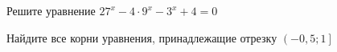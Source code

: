 \begin{ex}
	\begin{condition}
		\begin{enumcols}[label=\asbuk*)]
			\item Решите уравнение \( 27^x - 4\cdot 9^x -3^x + 4 = 0 \)
			\item Найдите все корни уравнения, принадлежащие отрезку \(\left(-0,5;1\right]  \)
		\end{enumcols}
	\end{condition}
\end{ex}